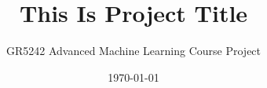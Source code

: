 \documentclass[letterpaper,12pt, oneside]{layout}
\title{This Is Project Title}
\subtitle{GR5242 Advanced Machine Learning Course Project}
\date{\today}
\begin{document}
\cleardoublepage
\maketitle

\frontmatter



\tableofcontents


\mainmatter





\appendix
\renewcommand\theequation{\Alph{chapter}--\arabic{equation}}
\renewcommand\thefigure{\Alph{chapter}--\arabic{figure}}
\renewcommand\thetable{\Alph{chapter}--\arabic{table}}




\backmatter



\end{document}
